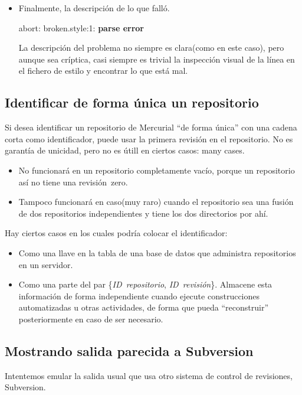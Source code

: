 {{\begin{itemize}
\item Finalmente, la descripción de lo que falló.
  \begin{codesample4}
    abort: broken.style:1: \textbf{parse error}
  \end{codesample4}
  La descripción del problema no siempre es clara(como en este caso),
  pero aunque sea críptica, casi siempre es trivial la inspección
  visual de la línea en el fichero de estilo y encontrar lo que está
  mal.
\end{itemize}

\subsection{Identificar de forma única un repositorio}

Si desea identificar un repositorio de Mercurial ``de forma única''
con una cadena corta como identificador, puede usar la primera
revisión en el repositorio.
No es garantía de unicidad, pero no es útill en ciertos casos:
many cases.
\begin{itemize}
\item No funcionará en un repositorio completamente vacío, porque un
  repositorio así no tiene una revisión~zero.
\item Tampoco funcionará en caso(muy raro) cuando el repositorio sea
  una fusión de dos repositorios independientes y tiene los dos
  directorios por ahí.
\end{itemize}
Hay ciertos casos en los cuales podría colocar el identificador:
\begin{itemize}
\item Como una llave en la tabla de una base de datos que administra
  repositorios en un servidor.
\item Como una parte del par \{\emph{ID~repositorio}, \emph{ID~revisión}\}.
  Almacene esta información de forma independiente cuando ejecute
  construcciones automatizadas u otras actividades, de forma que pueda
  ``reconstruir'' posteriormente en caso de ser necesario.
\end{itemize}

\subsection{Mostrando salida parecida a Subversion}

Intentemos emular la salida usual que usa otro sistema de control de
revisiones,  Subversion.

}}

